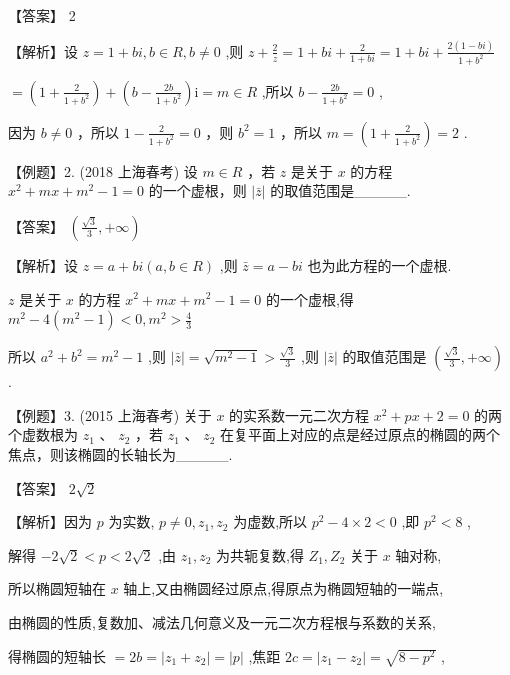 \documentclass[10pt]{article}
\begin{document}
【答案】 2

【解析】设 \(z = 1 + {bi},b \in  R,b \neq  0\) ,则 \(z + \frac{2}{z} = 1 + {bi} + \frac{2}{1 + {bi}} = 1 + {bi} + \frac{2\left( {1 - {bi}}\right) }{1 + {b}^{2}}\)

\(= \left( {1 + \frac{2}{1 + {b}^{2}}}\right)  + \left( {b - \frac{2b}{1 + {b}^{2}}}\right) \mathrm{i} = m \in  R\) ,所以 \(b - \frac{2b}{1 + {b}^{2}} = 0\) ,

因为 \(b \neq  0\) ，所以 \(1 - \frac{2}{1 + {b}^{2}} = 0\) ，则 \({b}^{2} = 1\) ，所以 \(m = \left( {1 + \frac{2}{1 + {b}^{2}}}\right)  = 2\) .

【例题】2. (2018 上海春考) 设 \(m \in  R\) ，若 \(z\) 是关于 \(x\) 的方程 \({x}^{2} + {mx} + {m}^{2} - 1 = 0\) 的一个虚根，则 \(\left| \bar{z}\right|\) 的取值范围是\_\_\_\_\_.

【答案】 \(\left( {\frac{\sqrt{3}}{3}, + \infty }\right)\)

【解析】设 \(z = a + {bi}\left( {a,b \in  R}\right)\) ,则 \(\bar{z} = a - {bi}\) 也为此方程的一个虚根.

\(z\) 是关于 \(x\) 的方程 \({x}^{2} + {mx} + {m}^{2} - 1 = 0\) 的一个虚根,得 \({m}^{2} - 4\left( {{m}^{2} - 1}\right)  < 0,{m}^{2} > \frac{4}{3}\)

所以 \({a}^{2} + {b}^{2} = {m}^{2} - 1\) ,则 \(\left| \bar{z}\right|  = \sqrt{{m}^{2} - 1} > \frac{\sqrt{3}}{3}\) ,则 \(\left| \bar{z}\right|\) 的取值范围是 \(\left( {\frac{\sqrt{3}}{3}, + \infty }\right)\) .

【例题】3. (2015 上海春考) 关于 \(x\) 的实系数一元二次方程 \({x}^{2} + {px} + 2 = 0\) 的两个虚数根为 \({z}_{1}\text{ 、 }{z}_{2}\) ，若 \({z}_{1}\text{ 、 }{z}_{2}\) 在复平面上对应的点是经过原点的椭圆的两个焦点，则该椭圆的长轴长为\_\_\_\_\_.

【答案】 \(2\sqrt{2}\)

【解析】因为 \(p\) 为实数, \(p \neq  0,{z}_{1},{z}_{2}\) 为虚数,所以 \({p}^{2} - 4 \times  2 < 0\) ,即 \({p}^{2} < 8\) ,

解得 \(- 2\sqrt{2} < p < 2\sqrt{2}\) ,由 \({z}_{1},{z}_{2}\) 为共轭复数,得 \({Z}_{1},{Z}_{2}\) 关于 \(x\) 轴对称,

所以椭圆短轴在 \(x\) 轴上,又由椭圆经过原点,得原点为椭圆短轴的一端点,

由椭圆的性质,复数加、减法几何意义及一元二次方程根与系数的关系,

得椭圆的短轴长 \(= {2b} = \left| {{z}_{1} + {z}_{2}}\right|  = \left| p\right|\) ,焦距 \({2c} = \left| {{z}_{1} - {z}_{2}}\right|  = \sqrt{8 - {p}^{2}}\) ,
\end{document}
